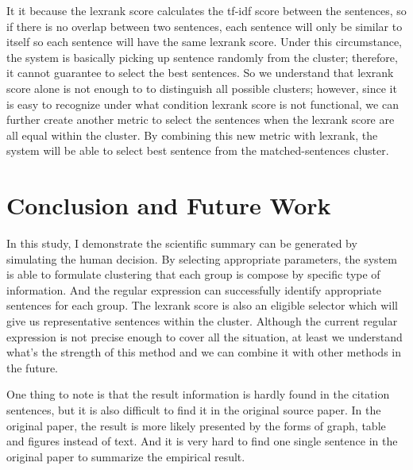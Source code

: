 \documentclass[hyp]{socreport}
\begin{document}
It it because the lexrank score calculates the tf-idf score between the sentences, so if there is no overlap between two sentences, each sentence will only be similar to itself so each sentence will have the same lexrank score. Under this circumstance, the system is basically picking up sentence randomly from  the cluster; therefore, it cannot guarantee to select the best sentences. 
So we understand that lexrank score alone is not enough to to distinguish all possible clusters; however, since it is easy to recognize under what condition lexrank score is not functional, we can further create another metric to select the sentences when the lexrank score are all equal within the cluster. By combining this new metric with lexrank, the system will be able to select best sentence from the matched-sentences cluster. 


\section{Conclusion and Future Work}

	In this study, I demonstrate the scientific summary can be generated by simulating the human decision. By selecting appropriate parameters, the system is able to formulate clustering that each group is compose by specific type of information. And  the regular expression can successfully identify appropriate sentences for each group. The lexrank score is also an eligible selector which will give us representative sentences within the cluster. Although the current regular expression is not precise enough to cover all the situation, at least we understand what’s the strength of this method and we can combine it with other methods in the future.

One thing to note is that the result information is hardly found in the citation sentences, but it is also difficult to find it in the original source paper. In the original paper, the result is more likely presented by the forms of graph, table and figures instead of text. And it is very hard to find one single sentence in the original paper to summarize the empirical result. 



\end{document}
